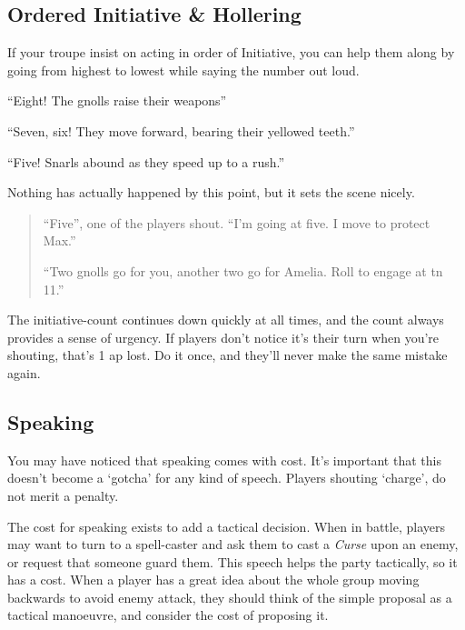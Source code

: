 \begin{multicols}{2}

\subsection{Ordered Initiative \& Hollering}

If your troupe insist on acting in order of Initiative, you can help them along by going from highest to lowest while saying the number out loud.

\begin{exampletext}

``Eight! The gnolls raise their weapons''

``Seven, six! They move forward, bearing their yellowed teeth.''

``Five! Snarls abound as they speed up to a rush.''

\end{exampletext}

Nothing has actually happened by this point, but it sets the scene nicely.

\begin{quote}

``Five'', one of the players shout.  ``I'm going at five.  I move to protect Max.''

``Two gnolls go for you, another two go for Amelia.  Roll to engage at \gls{tn} 11.''

\end{quote}

The initiative-count continues down quickly at all times, and the count always provides a sense of urgency.
If players don't notice it's their turn when you're shouting, that's 1 \gls{ap} lost.
Do it once, and they'll never make the same mistake again.

\subsection{Speaking}

You may have noticed that speaking comes with  cost.
It's important that this doesn't become a `gotcha' for any kind of speech.
Players shouting `charge', do not merit a penalty.

The cost for speaking exists to add a tactical decision.
When in battle, players may want to turn to a spell-caster and ask them to cast a \textit{Curse} upon an enemy, or request that someone guard them.
This speech helps the party tactically, so it has a cost.
When a player has a great idea about the whole group moving backwards to avoid enemy attack, they should think of the simple proposal as a tactical manoeuvre, and consider the cost of proposing it.


\end{multicols}
